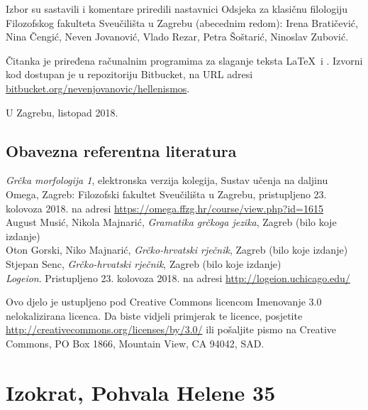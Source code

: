 \documentclass[a4paper,12pt,twoside]{report}
\begin{document}
\newpage

Izbor su sastavili i komentare priredili nastavnici Odsjeka za klasičnu filologiju Filozofskog fakulteta Sveučilišta u Zagrebu (abecednim redom): Irena Bratičević, Nina Čengić, Neven Jovanović, Vlado Rezar, Petra Šoštarić, Ninoslav Zubović.

Čitanka je priređena računalnim programima za slaganje teksta \LaTeX\ i \XeLaTeX. Izvorni kod dostupan je u repozitoriju Bitbucket, na URL adresi \href{https://bitbucket.org/nevenjovanovic/hellenismos}{bitbucket.org/nevenjovanovic/hellenismos}.

\medskip

U Zagrebu, listopad 2018.

\section*{Obavezna referentna literatura}

\textit{Grčka morfologija 1}, elektronska verzija kolegija, Sustav učenja na daljinu Omega, Zagreb: Filozofski fakultet Sveučilišta u Zagrebu, pristupljeno 23. kolovoza 2018. na adresi \url{https://omega.ffzg.hr/course/view.php?id=1615}\\
August Musić, Nikola Majnarić, \textit{Gramatika grčkoga jezika}, Zagreb (bilo koje izdanje)\\
Oton Gorski, Niko Majnarić, \textit{Grčko-hrvatski rječnik}, Zagreb (bilo koje izdanje)\\
Stjepan Senc, \textit{Grčko-hrvatski rječnik}, Zagreb (bilo koje izdanje)\\
\textit{Logeion}. Pristupljeno 23. kolovoza 2018. na adresi \url{http://logeion.uchicago.edu/}\\


\vspace*{\fill}

\noindent Ovo djelo je ustupljeno pod Creative Commons licencom Imenovanje 3.0 nelokalizirana licenca. Da biste vidjeli primjerak te licence, posjetite \url{http://creativecommons.org/licenses/by/3.0/} ili pošaljite pismo na Creative Commons, PO Box 1866, Mountain View, CA 94042, SAD.

\newpage




\setcounter{chapter}{20}

\chapter{Izokrat, Pohvala Helene 35}
\end{document}
